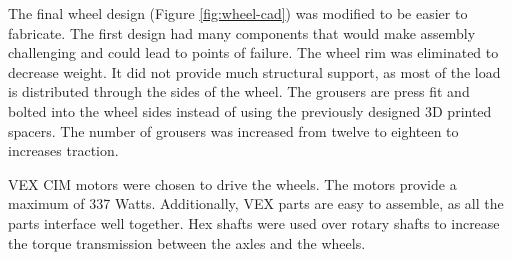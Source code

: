 \documentclass[class=article, crop=false]{standalone}
\begin{document}
	The final wheel design (Figure \ref{fig:wheel-cad}) was modified to be easier to fabricate. The first design had many components that would make assembly challenging and could lead to points of failure. The wheel rim was eliminated to decrease weight. It did not provide much structural support, as most of the load is distributed through the sides of the wheel. The grousers are press fit and bolted into the wheel sides instead of using the previously designed 3D printed spacers. The number of grousers was increased from twelve to eighteen to increases traction. 

	VEX CIM motors were chosen to drive the wheels. The motors provide a maximum of 337 Watts. Additionally, VEX parts are easy to assemble, as all the parts interface well together. Hex shafts were used over rotary shafts to increase the torque transmission between the axles and the wheels.
	
\end{document}
